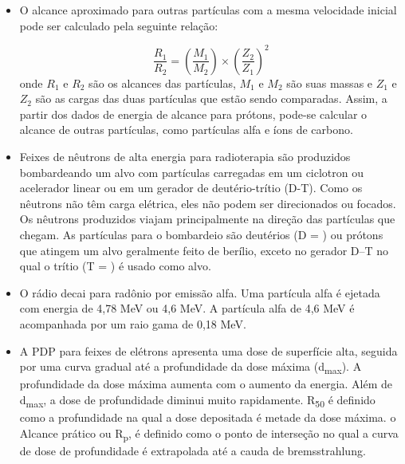 \documentclass[11pt,a4paper]{article}
\newcounter{exemplo}
\begin{document}
\begin{exemplo}
\begin{itemize}
        \item O alcance aproximado para outras partículas com a mesma velocidade inicial pode ser calculado pela seguinte relação:
        
            $$\frac{R_1}{R_2} = \left(\frac{M_1}{M_2}\right) \times \left(\frac{Z_2}{Z_1}\right)^2$$
        onde $R_1$ e $R_2$ são os alcances das partículas, $M_1$ e $M_2$ são suas massas e $Z_1$ e $Z_2$ são as cargas das duas partículas que estão sendo comparadas. Assim, a partir dos dados de energia de alcance para prótons, pode-se calcular o alcance de outras partículas, como partículas alfa e íons de carbono.

        \item Feixes de nêutrons de alta energia para radioterapia são produzidos bombardeando um alvo com partículas carregadas em um ciclotron ou acelerador linear ou em um gerador de deutério-trítio (D-T). Como os nêutrons não têm carga elétrica, eles não podem ser direcionados ou focados. Os nêutrons produzidos viajam principalmente na direção das partículas que chegam. As partículas para o bombardeio são deutérios (D = ) ou prótons  que atingem um alvo geralmente feito de berílio, exceto no gerador D–T no qual o trítio (T = ) é usado como alvo.
        
        \item O rádio decai para radônio por emissão alfa. Uma partícula alfa é ejetada com energia de 4,78 MeV ou 4,6 MeV. A partícula alfa de 4,6 MeV é acompanhada por um raio gama de 0,18 MeV.
        
        \item A PDP para feixes de elétrons apresenta uma dose de superfície alta, seguida por uma curva gradual até a profundidade da dose máxima (d\textsubscript{max}). A profundidade da dose máxima aumenta com o aumento da energia. Além  de d\textsubscript{max}, a dose de profundidade diminui muito rapidamente. R\textsubscript{50} é definido como a profundidade na qual a dose depositada é metade da dose máxima. o Alcance prático ou R\textsubscript{p}, é definido como o ponto de interseção no qual a curva de dose de profundidade é extrapolada até a cauda de bremsstrahlung.
        
    \end{itemize}
\end{exemplo}
\end{document}

